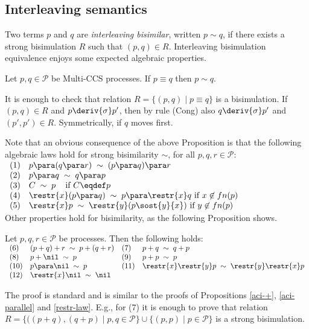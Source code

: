 \subsection{Interleaving semantics}

Two terms $p$ and $q$ are {\em interleaving bisimilar}, written
$p\sim q$, if there exists a strong bisimulation $R$ such that $(p,q)\in R$.
Interleaving bisimulation equivalence enjoys some expected algebraic properties. 


\begin{proposition}\label{prop1}
Let $p, q \in {\mathcal P}$ be Multi-CCS processes. If $p \equiv q$ then $p \sim q$.

\proof
It is enough to check that relation $R = \{(p, q) \mid p \equiv q\}$ is a bisimulation.
If $(p, q) \in R$ and $p \deriv{\sigma} p'$, then by rule (Cong)
also $q \deriv{\sigma} p'$ and $(p', p') \in R$. Symmetrically, if $q$ moves first.
\fine
\end{proposition}

Note that an obvious consequence of the above Proposition is that the following 
algebraic laws hold for strong bisimilarity $\sim$, for all $p, q, r \in {\mathcal P}$:\\

$\begin{array}{llll}
(1) & p \para (q \para r) \; \sim \; (p \para q) \para r \\
(2) & p \para q\; \sim \; q \para p \\
(3) & C \; \sim \; p \; \; \; \mbox{ if $C \eqdef p$ }\\
(4) & \restr{x}(p \para q) \; \sim \;  p \para \restr{x}q \mbox{  if } x \not\in fn(p) \\
(5) & \restr{x}p \; \sim \;  \restr{y} (p\sost{y}{x}) \mbox{  if } y \not\in fn(p) \\
\end{array}$\\

Other properties hold for bisimilarity, as the following Proposition shows.

\begin{proposition}\label{prop2}
Let $p, q, r \in {\mathcal P}$ be processes. Then the following holds:\\

$\begin{array}{llll}
(6) & (p + q) + r \; \sim \; p + (q +r)  &
(7) & p + q\; \sim \; q + p  \\
(8) & p + \nil \; \sim \;  p  &
(9) & p + p \; \sim \; p \\
(10) & p \para \nil \; \sim \;  p &
(11) & \restr{x}\restr{y}p \; \sim \;  \restr{y}\restr{x}p\\
(12) & \restr{x} \nil \; \sim \; \nil &
\end{array}$

\proof 
The proof is standard and is similar to the proofs of Propositions \ref{aci-+}, \ref{aci-parallel} and \ref{restr-law}.
E.g., for (7) it is enough to prove that relation $R = \{ ((p+q),(q+p) \mid p,q \in   {\mathcal P} \} \cup 
\{ (p,p) \mid p \in  {\mathcal P} \} $ is a strong bisimulation. 
\fine
\end{proposition}

